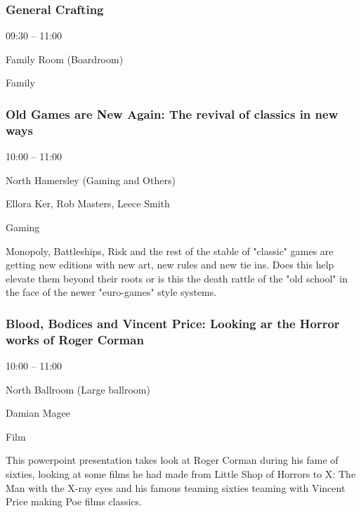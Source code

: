 \documentclass{scrreprt}
\begin{document}
\begin{multicols}{2}
\subsubsection*{General Crafting}\begin{description}
\setlength{\itemsep}{0pt}
\setlength{\parsep}{0pt}
\setlength{\parskip}{0pt}
\item[Time:]{09:30 -- 11:00}
\item[Venue:]{Family Room (Boardroom)}
\item[Tags:]{Family}\end{description}

\subsubsection*{Old Games are New Again: The revival of classics in new ways}\begin{description}
\setlength{\itemsep}{0pt}
\setlength{\parsep}{0pt}
\setlength{\parskip}{0pt}
\item[Time:]{10:00 -- 11:00}
\item[Venue:]{North Hamersley (Gaming and Others)}
\item[People:]{Ellora Ker, Rob Masters, Leece Smith}
\item[Tags:]{Gaming}\end{description}
Monopoly, Battleships, Risk and the rest of the stable of "classic" games are getting new editions with new art, new rules and new tie ins. Does this help elevate them beyond their roots or is this the death rattle of the "old school" in the face of the newer "euro-games" style systems.
\subsubsection*{Blood, Bodices and Vincent Price: Looking ar the Horror works of Roger Corman}\begin{description}
\setlength{\itemsep}{0pt}
\setlength{\parsep}{0pt}
\setlength{\parskip}{0pt}
\item[Time:]{10:00 -- 11:00}
\item[Venue:]{North Ballroom (Large ballroom)}
\item[People:]{Damian Magee}
\item[Tags:]{Film}\end{description}
This powerpoint presentation takes look at Roger Corman during his fame of sixties, looking at some films he had made from Little Shop of Horrors to X: The Man with the X-ray eyes and his famous teaming sixties teaming with Vincent Price making Poe films classics.

\end{multicols}
\end{document}
